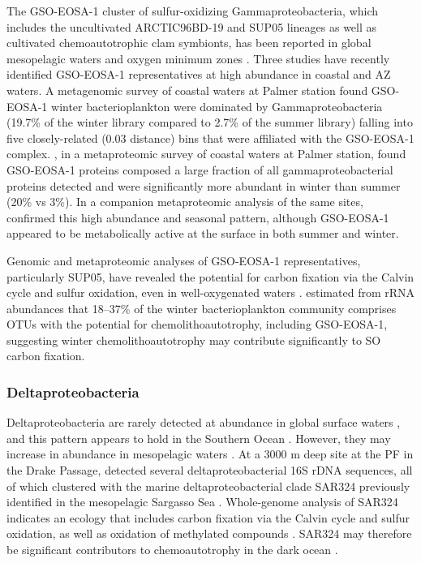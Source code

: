 
The GSO-EOSA-1 cluster of sulfur-oxidizing Gammaproteobacteria, which includes the uncultivated ARCTIC96BD-19 and SUP05 lineages as well as cultivated chemoautotrophic clam symbionts, has been reported in global mesopelagic waters \cite{Swan:2011hb} and oxygen minimum zones \cite{Walsh:2009fja,Canfield:2010ib}.
Three studies have recently identified GSO-EOSA-1 representatives at high abundance in coastal and \ac{AZ} waters.
A metagenomic survey of coastal waters at Palmer station found GSO-EOSA-1 winter bacterioplankton were dominated by Gammaproteobacteria (19.7\% of the winter library compared to 2.7\% of the summer library) falling into five closely-related (0.03 distance) bins that were affiliated with the GSO-EOSA-1 complex.
\citet{Grzymski:2012ej}, in a metaproteomic survey of coastal waters at Palmer station, found GSO-EOSA-1 proteins composed a large fraction of all gammaproteobacterial proteins detected and were significantly more abundant in winter than summer (20\% vs 3\%).
In a companion metaproteomic analysis of the same sites, \citet{Williams:2012bs} confirmed this high abundance and seasonal pattern, although GSO-EOSA-1 appeared to be metabolically active at the surface in both summer and winter.

Genomic and metaproteomic analyses of GSO-EOSA-1 representatives, particularly SUP05, have revealed the potential for carbon fixation via the Calvin cycle and sulfur oxidation, even in well-oxygenated waters \cite{Walsh:2009fja,Swan:2011hb,Grzymski:2012ej}.
\citet{Grzymski:2012ej} estimated from rRNA abundances that 18--37\% of the winter bacterioplankton community comprises \acp{OTU} with the potential for chemolithoautotrophy, including GSO-EOSA-1, suggesting winter chemolithoautotrophy may contribute significantly to \ac{SO} carbon fixation.

\subsubsection{Deltaproteobacteria}

Deltaproteobacteria are rarely detected at abundance in global surface waters \citep[see e.g.][]{Venter:2004hg}, and this pattern appears to hold in the Southern Ocean \cite{Murray:2007db,West:2008kc,Ghiglione:2011ee,Murray:2011ib,Ducklow:2011jl,Jamieson:2012up}.
However, they may increase in abundance in mesopelagic waters \cite{Wright:1997vg,Pham:2008bba,Zaballos:2006hr}.
At a 3000 m deep site at the \ac{PF} in the Drake Passage, \citet{LopezGarcia:2001vp} detected several deltaproteobacterial 16S rDNA sequences, all of which clustered with the marine deltaproteobacterial clade SAR324 previously identified in the mesopelagic Sargasso Sea \cite{Wright:1997vg}.
Whole-genome analysis of SAR324 indicates an ecology that includes carbon fixation via the Calvin cycle and sulfur oxidation, as well as oxidation of methylated compounds \cite{Swan:2011hb}.
SAR324 may therefore be significant contributors to chemoautotrophy in the dark ocean \cite{Swan:2011hb}.


